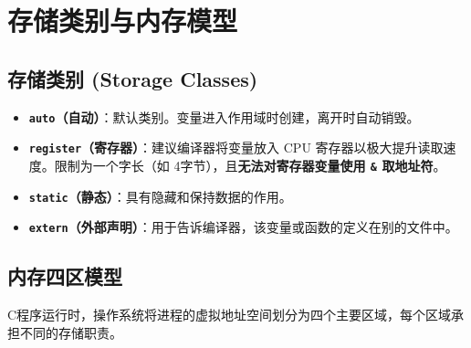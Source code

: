 \clearpage
\begingroup
\let\clearpage\relax
\let\cleardoublepage\relax
\vspace*{\fill}
\chapter{存储类别与内存模型}
\vspace*{\fill}
\endgroup
\clearpage


\section{存储类别 (Storage Classes)}

\begin{itemize}
    \item \textbf{\texttt{auto}（自动）}：默认类别。变量进入作用域时创建，离开时自动销毁。
    \item \textbf{\texttt{register}（寄存器）}：建议编译器将变量放入 CPU 寄存器以极大提升读取速度。限制为一个字长（如 4字节），且\textbf{无法对寄存器变量使用 \texttt{\&} 取地址符}。
    \item \textbf{\texttt{static}（静态）}：具有隐藏和保持数据的作用。
    \item \textbf{\texttt{extern}（外部声明）}：用于告诉编译器，该变量或函数的定义在别的文件中。
\end{itemize}

\section{内存四区模型}

C程序运行时，操作系统将进程的虚拟地址空间划分为四个主要区域，每个区域承担不同的存储职责。

